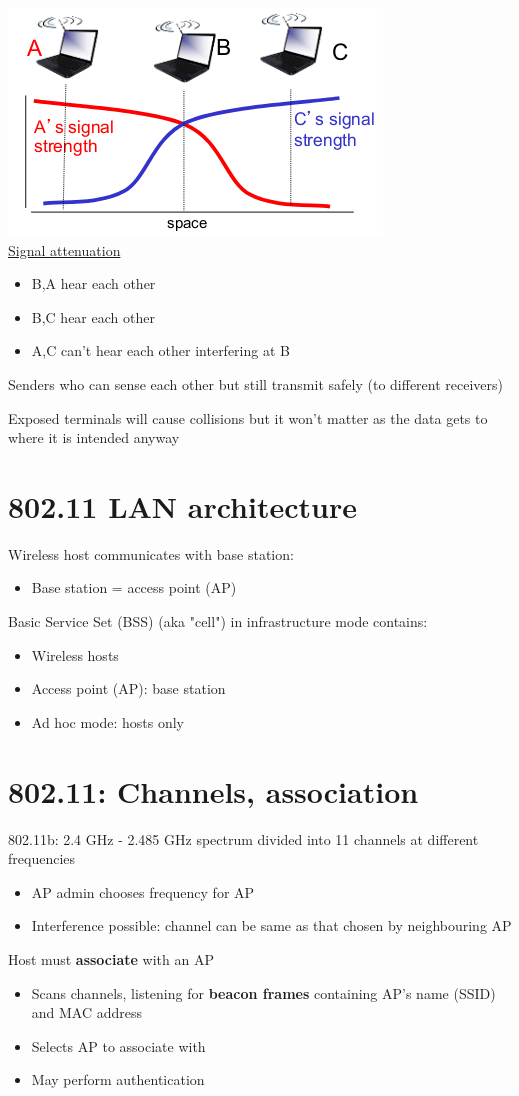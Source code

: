 \documentclass{article}[18pt]
\begin{document}
\begin{minipage}{0.5\textwidth}
\includegraphics[scale=0.7]{"signal attenuation"}\\
\underline{Signal attenuation}
\begin{itemize}
	\item B,A hear each other
	\item B,C hear each other
	\item A,C can't hear each other interfering at B
\end{itemize}
\end{minipage}
\begin{defin}
Senders who can sense each other but still transmit safely (to different receivers)
\end{defin}
Exposed terminals will cause collisions but it won't matter as the data gets to where it is intended anyway
\section{802.11 LAN architecture}
Wireless host communicates with base station:
\begin{itemize}
	\item Base station = access point (AP)
\end{itemize}
Basic Service Set (BSS) (aka "cell") in infrastructure mode contains:
\begin{itemize}
	\item Wireless hosts
	\item Access point (AP): base station
	\item Ad hoc mode: hosts only
\end{itemize}
\section{802.11: Channels, association}
802.11b: 2.4 GHz - 2.485 GHz spectrum divided into 11 channels at different frequencies
\begin{itemize}
	\item AP admin chooses frequency for AP
	\item Interference possible: channel can be same as that chosen by neighbouring AP 
\end{itemize}
Host must \textbf{associate} with an AP
\begin{itemize}
	\item Scans channels, listening for \textbf{beacon frames} containing AP's name (SSID) and MAC address
	\item Selects AP to associate with
	\item May perform authentication
\end{itemize}
\end{document}
